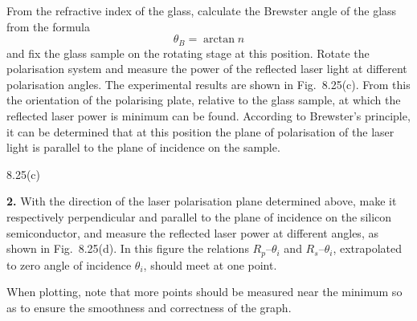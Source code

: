 From the refractive index of the glass, calculate the Brewster angle of the glass from the formula
\begin{equation}
\theta_B=\arctan n \tag{4}
\end{equation}
and fix the glass sample on the rotating stage at this position. Rotate the polarisation system and measure the power of the reflected laser light at different polarisation angles. The experimental results are shown in Fig.~8.25(c). From this the orientation of the polarising plate, relative to the glass sample, at which the reflected laser power is minimum can be found. According to Brewster's principle, it can be determined that at this position the plane of polarisation of the laser light is parallel to the plane of incidence on the sample.

\begin{figbox}{8.25(c)}
\end{figbox}

\textbf{2.} With the direction of the laser polarisation plane determined above, make it respectively perpendicular and parallel to the plane of incidence on the silicon semiconductor, and measure the reflected laser power at different angles, as shown in Fig.~8.25(d). In this figure the relations $R_p$--$\theta_i$ and $R_s$--$\theta_i$, extrapolated to zero angle of incidence $\theta_i$, should meet at one point.

When plotting, note that more points should be measured near the minimum so as to ensure the smoothness and correctness of the graph.


